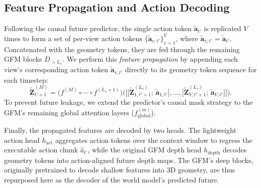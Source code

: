 \documentclass{llmxive}
\begin{document}
\subsection{Feature Propagation and Action Decoding}
\label{sec:method:decoding}

Following the causal future predictor, the single action token $\tilde{\mathbf{a}}_{t'}$ is replicated $V$ times to form a set of per-view action tokens $\{\tilde{\mathbf{a}}_{v,t'}\}_{v=1}^{V}$, where $\tilde{\mathbf{a}}_{v,t'} = \tilde{\mathbf{a}}_{t'}$. Concatenated with the geometry tokens, they are fed through the remaining GFM blocks $D_{> L_s}$. We perform this \emph{feature propagation} by appending each view's corresponding action token $\tilde{\mathbf{a}}_{v,t'}$ directly to its geometry token sequence for each timestep:
\begin{equation}
    \tilde{\mathbf{Z}}_{t'+1}^{(M)} = \big(f^{(M)} \circ \cdots \circ f^{(L_s+1)}\big)\!\Big(\Big[\big[\tilde{\mathbf{Z}}_{1,t'+1}^{(L_s)};\, \tilde{\mathbf{a}}_{1,t'}\big], \ldots, \big[\tilde{\mathbf{Z}}_{V,t'+1}^{(L_s)};\, \tilde{\mathbf{a}}_{V,t'}\big]\Big]\Big).
\end{equation}
To prevent future leakage, we extend the predictor's causal mask strategy to the GFM's remaining global attention layers ($f_{\text{global}}^{(m)}$).

Finally, the propagated features are decoded by two heads. The lightweight action head $h_{\text{act}}$ aggregates action tokens over the context window to regress the executable action chunk $\hat a_{t'}$, while the original GFM depth head $h_{\text{depth}}$ decodes geometry tokens into action-aligned future depth maps. The GFM's deep blocks, originally pretrained to decode shallow features into 3D geometry, are thus repurposed here as the decoder of the world model's predicted future.
\end{document}
